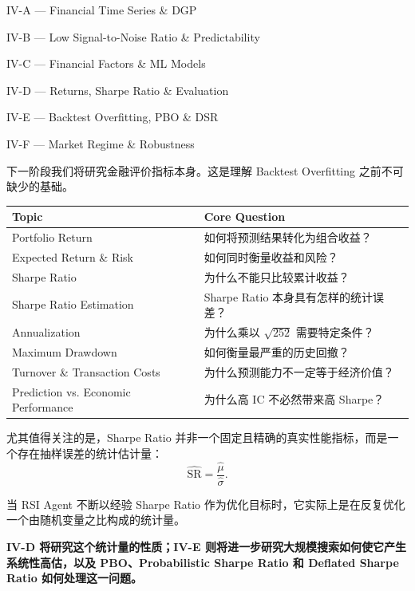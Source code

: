 IV-A --- Financial Time Series \& DGP

IV-B --- Low Signal-to-Noise Ratio \& Predictability

IV-C --- Financial Factors \& ML Models

IV-D --- Returns, Sharpe Ratio \& Evaluation

IV-E --- Backtest Overfitting, PBO \& DSR

IV-F --- Market Regime \& Robustness

下一阶段我们将研究金融评价指标本身。这是理解 Backtest Overfitting 之前不可缺少的基础。

\begin{readertable}
\begin{longtable}[]{@{}
  >{\raggedright\arraybackslash}p{}
  >{\raggedright\arraybackslash}p{}@{}}
\toprule
Topic & Core Question \\
\midrule
\endhead
Portfolio Return & 如何将预测结果转化为组合收益？ \\
Expected Return \& Risk & 如何同时衡量收益和风险？ \\
Sharpe Ratio & 为什么不能只比较累计收益？ \\
Sharpe Ratio Estimation & Sharpe Ratio 本身具有怎样的统计误差？ \\
Annualization & 为什么乘以 \(\sqrt{252}\) 需要特定条件？ \\
Maximum Drawdown & 如何衡量最严重的历史回撤？ \\
Turnover \& Transaction Costs & 为什么预测能力不一定等于经济价值？ \\
Prediction vs. Economic Performance & 为什么高 IC 不必然带来高 Sharpe？ \\
\bottomrule
\end{longtable}
\end{readertable}

尤其值得关注的是，Sharpe Ratio 并非一个固定且精确的真实性能指标，而是一个存在抽样误差的统计估计量：
\[\widehat{\mathrm{SR}}
=
\frac{\hat\mu}{\hat\sigma}.\]

当 RSI Agent 不断以经验 Sharpe Ratio 作为优化目标时，它实际上是在反复优化一个由随机变量之比构成的统计量。

\textbf{IV-D 将研究这个统计量的性质；IV-E 则将进一步研究大规模搜索如何使它产生系统性高估，以及 PBO、Probabilistic Sharpe Ratio 和 Deflated Sharpe Ratio 如何处理这一问题。}
